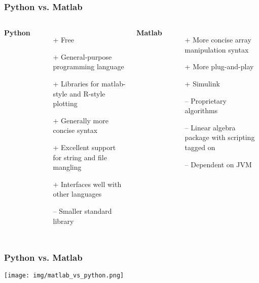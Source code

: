 \documentclass{beamer}
\begin{document}
\begin{frame}
\frametitle{Python vs. Matlab}
\begin{columns}[t] %

\textbf{Python}
\begin{itemize}
\item[+] Free
\item[+] General-purpose programming language
\item[+] Libraries for matlab-style and R-style plotting
\item[+] Generally more concise syntax
\item[+] Excellent support for string and file mangling
\item[+] Interfaces well with other languages
\item[--] Smaller standard library
\end{itemize}

\textbf{Matlab}
\begin{itemize}
\item[+] More concise array manipulation syntax
\item[+] More plug-and-play
\item[+] Simulink
\item[--] Proprietary algorithms
\item[--] Linear algebra package with scripting tagged on
\item[--] Dependent on JVM

\end{itemize}
\end{columns}

\end{frame}


\begin{frame}
\frametitle{Python vs. Matlab}

\texttt{[image: img/matlab\_vs\_python.png]}

\end{frame}
\end{document}
